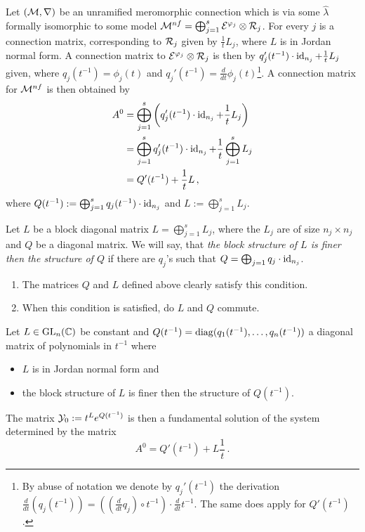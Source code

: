 Let $(\mathcal{M},\nabla)$ be an unramified meromorphic connection which is via some
$\hat\lambda$ formally isomorphic to some model
$\mathcal{M}^{nf}=\bigoplus_{j=1}^s\mathcal{E}^{\varphi_j}\otimes\mathcal{R}_j$.
For every $j$ is a connection matrix, corresponding to $\mathcal{R}_j$ given by
$\frac{1}{t}L_j$, where $L$ is in Jordan normal form.
A connection matrix to $\mathcal{E}^{\varphi_j}\otimes\mathcal{R}_j$ is then by
$q_j'(t^{-1})\cdot\operatorname{id}_{n_j}+\frac{1}{t}L_j$ given\TODO[(cf.~???)], where
$q_j(t^{-1})=\phi_j(t)$ and $q_j'(t^{-1})=\frac{d}{dt}\phi_j(t)$\footnote{By
abuse of notation we denote by $q_j'(t^{-1})$ the derivation
$\frac{d}{dt}(q_j(t^{-1}))=\left(\left(\frac{d}{dt}q_j\right)\circ t^{-1}\right)
\cdot\frac{d}{dt}t^{-1}$. The same does apply for $Q'(t^{-1})$.}.
A connection matrix for $\mathcal{M}^{nf}$ is then obtained by
\begin{align*}
  A^0&= \bigoplus_{j=1}^s
  \left(q_j'(t^{-1})\cdot\operatorname{id}_{n_j}+\frac{1}{t}L_j\right)
  \\&=\bigoplus_{j=1}^sq_j'(t^{-1})\cdot\operatorname{id}_{n_j}
    +\frac{1}{t}\bigoplus_{j=1}^sL_j
  \\&=Q'(t^{-1})+\frac{1}{t}L \,,
\end{align*}
where
$Q(t^{-1}):=\bigoplus_{j=1}^sq_j(t^{-1})\cdot\operatorname{id}_{n_j}$
and $L:=\bigoplus_{j=1}^sL_j$.
\begin{defn}\label{defn:structureComparison}
  Let $L$ be a block diagonal matrix $L=\bigoplus_{j=1}^sL_j$, where the $L_j$
  are of size $n_j\times n_j$ and $Q$ be a diagonal matrix.
  We will say, that \emph{the block structure of $L$ is finer then the
  structure of $Q$} if there are $q_j$'s such that
  $Q=\bigoplus_{j=1}q_j\cdot\operatorname{id}_{n_j}$.
  \begin{s-rem}
    \begin{enumerate}\label{rem:structureComparison}
      \item The matrices $Q$ and $L$ defined above clearly satisfy this
        condition.
      \item When this condition is satisfied, do $L$ and $Q$ commute.
    \end{enumerate}
  \end{s-rem}
\end{defn}
\begin{prop}\label{prop:fundSolBuilder}
  Let $L\in \operatorname{GL}_n(\mathbb{C})$ be constant and
  $Q(t^{-1})=\operatorname{diag}(q_1(t^{-1}),\dots,q_n(t^{-1}))$ a diagonal matrix of
  polynomials in $t^{-1}$ where
  \begin{itemize}
    \item $L$ is in Jordan normal form and
    \item the block structure of $L$ is finer then the structure of
      $Q(t^{-1})$.
  \end{itemize}
  The matrix $\mathcal{Y}_0:=t^L e^{Q(t^{-1})}$ is then a fundamental solution of the
  system determined by the matrix
  \[
    A^0=Q'(t^{-1})+L\frac{1}{t} \,.
  \]
\end{prop}
